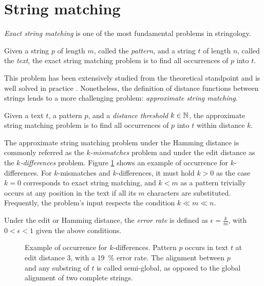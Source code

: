 \section{String matching}

\emph{Exact string matching} is one of the most fundamental problems in stringology.
\begin{definition}
\citep{Gusfield1997}
Given a string $p$ of length $m$, called the \emph{pattern}, and a string $t$ of length $n$, called the \emph{text}, the exact string matching problem is to find all occurrences of $p$ into $t$.
\end{definition}

This problem has been extensively studied from the theoretical standpoint and is well solved in practice \citep{Faro2013}.
Nonetheless, the definition of distance functions between strings lends to a more challenging problem: \emph{approximate string matching}.

\begin{definition}
\citep{Galil1988}
Given a text $t$, a pattern $p$, and a \emph{distance threshold} $k \in \mathbb {N}$, the approximate string matching problem is to find all occurrences of $p$ into $t$ within distance $k$.
\end{definition}
The approximate string matching problem under the Hamming distance is commonly referred as the \emph{$k$-mismatches} problem and under the edit distance as the \emph{$k$-differences} problem.
Figure \ref{fig:edit-occurrence} shows an example of occurrence for $k$-differences.
For $k$-mismatches and $k$-differences, it must hold $k > 0$ as the case $k = 0$ corresponds to exact string matching, and $k < m$ as a pattern trivially occurs at any position in the text if all its $m$ characters are substituted.
Frequently, the problem's input respects the condition $k \ll m \ll n$.
\begin{definition}
Under the edit or Hamming distance, the \emph{error rate} is defined as $\epsilon = \frac{k}{m}$, with $0 < \epsilon < 1$ given the above conditions.
\end{definition}

\begin{figure}[h]
\begin{center}
\caption[Example of occurrence for $k$-differences]{Example of occurrence for $k$-differences. Pattern $p$ occurs in text $t$ at edit distance 3, \ie with a 19~\% error rate.
The alignment between $p$ and any substring of $t$ is called semi-global, as opposed to the global alignment of two complete strings.
}
\label{fig:edit-occurrence}

\end{center}
\end{figure}


